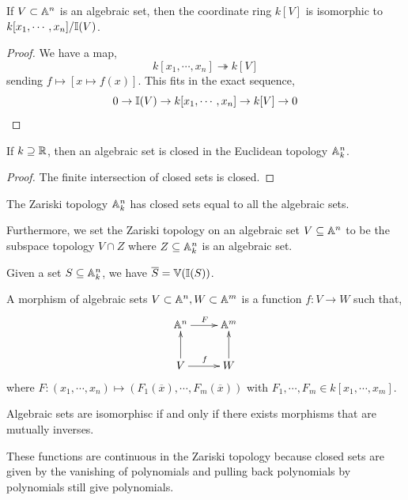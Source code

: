 \documentclass[12pt]{article}
\begin{document}
\begin{lemma}
    If $V \subset \mathbb A^n$ is an algebraic set, then the coordinate ring $k[V]$ is isomorphic to $k[x_1, \cdots, x_n]/\mathbb I(V)$. 
\end{lemma}
\begin{proof}
    We have a map,
    \[ k[x_1, \cdots, x_n] \twoheadrightarrow k[V] \]
    sending $f \mapsto [x \mapsto f(x)]$. This fits in the exact sequence,
    \[ 0 \to \mathbb I(V) \to k[x_1, \cdots, x_n] \to k[V] \to 0\]
\end{proof}

\begin{lemma}
    If $k \supseteq \mathbb R$, then an algebraic set is closed in the Euclidean topology $\mathbb A^n_k$. 
\end{lemma}
\begin{proof}
    The finite intersection of closed sets is closed.
\end{proof}

\begin{definition}
    The Zariski topology $\mathbb A^n_k$ has closed sets equal to all the algebraic sets. 
\end{definition}

Furthermore, we set the Zariski topology on an algebraic set $V \subseteq \mathbb A^n$ to be the subspace topology $V \cap Z$ where $Z \subseteq \mathbb A^n_k$ is an algebraic set. 

Given a set $S \subseteq \mathbb A^n_k$, we have $\overline{S} = \mathbb V(\mathbb I(S))$. 

\begin{definition}
    A morphism of algebraic sets $V \subset \mathbb A^n, W \subset \mathbb A^m$ is a function $f: V \to W$ such that, 
    \[ \xymatrix{ \A^n \ar[r]^F & \A^m \\ V \ar[u] \ar[r]^f & W \ar[u] }\]
    where $F: (x_1, \cdots, x_n) \mapsto (F_1(\overline x), \cdots, F_m(\overline x))$ with $F_1, \cdots, F_m \in k[x_1, \cdots, x_m]$.
\end{definition}

\begin{definition}
    Algebraic sets are isomorphisc if and only if there exists morphisms that are mutually inverses. 
\end{definition}

\begin{remark}
    These functions are continuous in the Zariski topology because closed sets are given by the vanishing of polynomials and pulling back polynomials by polynomials still give polynomials. 
\end{remark}
\end{document}
